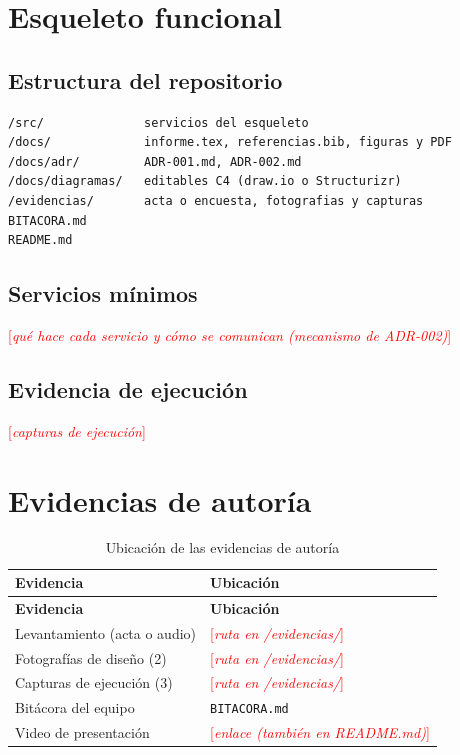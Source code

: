 \documentclass[11pt,a4paper]{article}
\newcommand{\pendiente}[1]{\textcolor{red}{[\textit{#1}]}}
\begin{document}
\section{Esqueleto funcional}

\subsection{Estructura del repositorio}
\begin{lstlisting}
/src/              servicios del esqueleto
/docs/             informe.tex, referencias.bib, figuras y PDF
/docs/adr/         ADR-001.md, ADR-002.md
/docs/diagramas/   editables C4 (draw.io o Structurizr)
/evidencias/       acta o encuesta, fotografias y capturas
BITACORA.md
README.md
\end{lstlisting}

\subsection{Servicios mínimos}
\pendiente{qué hace cada servicio y cómo se comunican (mecanismo de ADR-002)}

\subsection{Evidencia de ejecución}
\pendiente{capturas de ejecución}

\section{Evidencias de autoría}
\begin{xltabular}{\textwidth}{L{5cm}X}
  \caption{Ubicación de las evidencias de autoría}\label{tab:evidencias}\\
  \toprule
  \textbf{Evidencia} & \textbf{Ubicación} \\
  \midrule
  \endfirsthead
  \toprule
  \textbf{Evidencia} & \textbf{Ubicación} \\
  \midrule
  \endhead
  \bottomrule
  \endfoot
  Levantamiento (acta o audio)  & \pendiente{ruta en /evidencias/} \\
    Fotografías de diseño (2)     & \pendiente{ruta en /evidencias/} \\
    Capturas de ejecución (3)     & \pendiente{ruta en /evidencias/} \\
    Bitácora del equipo           & \texttt{BITACORA.md} \\
    Video de presentación         & \pendiente{enlace (también en README.md)} \\
\end{xltabular}
\end{document}
